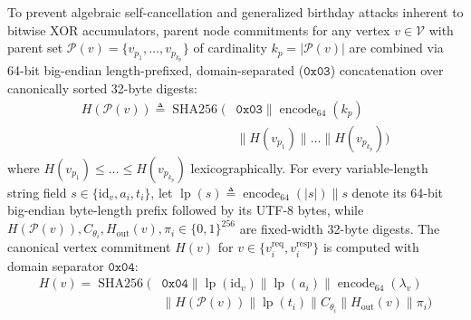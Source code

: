 \documentclass[conference,10pt]{IEEEtran}
\begin{document}
To prevent algebraic self-cancellation and generalized birthday attacks inherent to bitwise XOR accumulators, parent node commitments for any vertex $v \in \mathcal{V}$ with parent set $\mathcal{P}(v) = \{v_{p_1}, \dots, v_{p_{k_p}}\}$ of cardinality $k_p = |\mathcal{P}(v)|$ are combined via 64-bit big-endian length-prefixed, domain-separated ($\mathtt{0x03}$) concatenation over canonically sorted 32-byte digests:
\begin{equation}
\begin{split}
H(\mathcal{P}(v)) \triangleq \operatorname{SHA256}\big(&\mathtt{0x03} \parallel \operatorname{encode}_{64}(k_p) \\
&\parallel H(v_{p_1}) \parallel \dots \parallel H(v_{p_{k_p}})\big)
\end{split}
\end{equation}
where $H(v_{p_1}) \le \dots \le H(v_{p_{k_p}})$ lexicographically. For every variable-length string field $s \in \{\text{id}_v, a_i, t_i\}$, let $\operatorname{lp}(s) \triangleq \operatorname{encode}_{64}(|s|) \parallel s$ denote its 64-bit big-endian byte-length prefix followed by its UTF-8 bytes, while $H(\mathcal{P}(v)), C_{\theta_i}, H_{\text{out}}(v), \pi_i \in \{0,1\}^{256}$ are fixed-width 32-byte digests. The canonical vertex commitment $H(v)$ for $v \in \{v_i^{\text{req}}, v_i^{\text{resp}}\}$ is computed with domain separator $\mathtt{0x04}$:
\begin{equation}
\begin{split}
H(v) = \operatorname{SHA256}\Big(&\mathtt{0x04} \parallel \operatorname{lp}(\text{id}_v) \parallel \operatorname{lp}(a_i) \parallel \operatorname{encode}_{64}(\lambda_v) \\
&\parallel H(\mathcal{P}(v)) \parallel \operatorname{lp}(t_i) \parallel C_{\theta_i} \parallel H_{\text{out}}(v) \parallel \pi_i\Big)
\end{split}
\end{equation}
\end{document}
